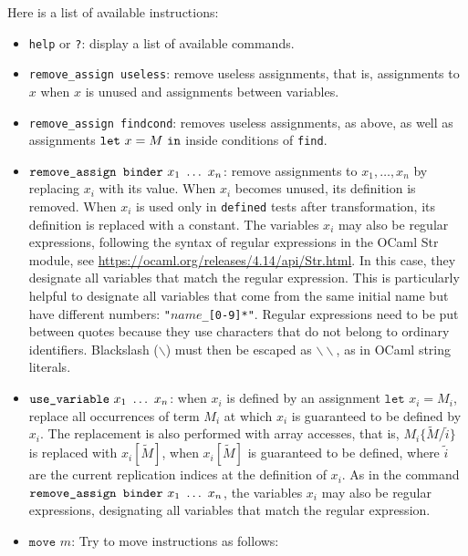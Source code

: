 \documentclass{article}
\newcommand{\tup}[1]{\widetilde{#1}}
\begin{document}
Here is a list of available instructions:
\begin{itemize}

\item \texttt{help} or \texttt{?}: display a list of available commands.

\item \texttt{remove\string_assign useless}: remove useless assignments,
that is, assignments to $x$ when $x$ is unused and assignments
between variables.

\item \texttt{remove\string_assign findcond}: removes useless assignments,
as above, as well as assignments ${\tt let}\ x = M\ {\tt in}$ inside
conditions of {\tt find}. 

\item $\texttt{remove\string_assign binder}\ x_1\ \dots\ x_n$: remove assignments
to $x_1, \ldots, x_n$ by replacing $x_i$ with its value. When $x_i$ becomes unused,
its definition is removed. When $x_i$ is used only in \texttt{defined} 
tests after transformation, its definition is replaced with 
a constant. The variables $x_i$ may also be regular expressions, 
following the syntax of regular expressions in the OCaml Str module, see
  \url{https://ocaml.org/releases/4.14/api/Str.html}.
In this case, they designate all variables that match the regular expression.
This is particularly helpful to designate all variables that come
from the same initial name but have different numbers:
\texttt{"$\mathit{name}$\_[0-9]*"}. Regular expressions 
need to be put between quotes because they use characters that do
not belong to ordinary identifiers. Blackslash ($\backslash$) must then be escaped 
as $\backslash\backslash$, as in OCaml string literals.

\item $\texttt{use\string_variable}\ x_1\ \dots\ x_n$: when $x_i$ is defined
  by an assignment $\texttt{let }x_i = M_i$, replace all occurrences of term
  $M_i$ at which $x_i$ is guaranteed to be defined by $x_i$. The replacement
  is also performed with array accesses, that is, $M_i\{\tup{M}/\tup{i}\}$
  is replaced with $x_i[\tup{M}]$, when $x_i[\tup{M}]$ is guaranteed to be
  defined, where $\tup{i}$ are the current replication indices at the
  definition of $x_i$.
  As in the command $\texttt{remove\string_assign binder}\ x_1\ \dots\ x_n$,
  the variables $x_i$ may also be regular expressions, designating
  all variables that match the regular expression.

\item $\texttt{move }m$: Try to move instructions as follows:
\begin{itemize}


\end{itemize}
\end{itemize}
\end{document}
